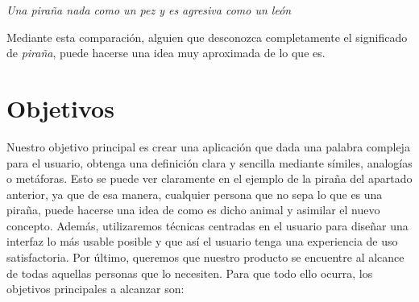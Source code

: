 \textit{Una piraña nada como un pez y es agresiva como un león} \newline

Mediante esta comparación, alguien que desconozca completamente el significado de \textit{piraña}, puede hacerse una idea muy aproximada de lo que es.
\section{Objetivos}
\label{cap:sec:objetivos}
Nuestro objetivo principal es crear una aplicación que dada una palabra compleja para el usuario, obtenga una definición clara y sencilla mediante símiles, analogías o metáforas. 
Esto se puede ver claramente en el ejemplo de la piraña del apartado anterior, ya que de esa manera, cualquier persona que no sepa lo que es una piraña, puede hacerse una idea de como es dicho animal y asimilar el nuevo concepto. Además, utilizaremos técnicas centradas en el usuario para diseñar una interfaz lo más usable posible y que así el usuario tenga una experiencia de uso satisfactoria. Por último, queremos que nuestro producto se encuentre al alcance de todas aquellas personas que lo necesiten.
 Para que todo ello ocurra, los objetivos principales a alcanzar son:
